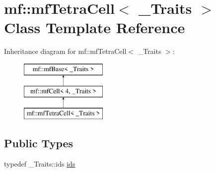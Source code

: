\hypertarget{classmf_1_1mfTetraCell}{
\section{mf::mfTetraCell$<$ \_\-Traits $>$ Class Template Reference}
\label{classmf_1_1mfTetraCell}
}
Inheritance diagram for mf::mfTetraCell$<$ \_\-Traits $>$:\begin{figure}[H]
\begin{center}
\leavevmode
\includegraphics[height=3.000000cm]{classmf_1_1mfTetraCell}
\end{center}
\end{figure}
\subsection*{Public Types}
\begin{DoxyCompactItemize}
\item 
typedef \_\-Traits::ids \hyperlink{classmf_1_1mfTetraCell_a1fe27f9bfd856ec3464b2b671ceaf558}{ids}
\end{DoxyCompactItemize}

